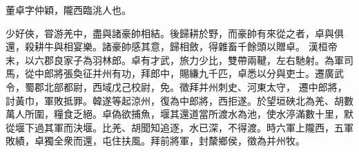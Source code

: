 \begin{pinyinscope}
 
 
 董卓字仲穎，隴西臨洮人也。
 
 
 少好俠，甞游羌中，盡與諸豪帥相結。後歸耕於野，而豪帥有來從之者，卓與俱還，殺耕牛與相宴樂。諸豪帥感其意，歸相斂，得雜畜千餘頭以贈卓。
 漢桓帝末，以六郡良家子為羽林郎。卓有才武，旅力少比，雙帶兩鞬，左右馳射。為軍司馬，從中郎將張奐征并州有功，拜郎中，賜縑九千匹，卓悉以分與吏士。遷廣武令，蜀郡北部都尉，西域戊己校尉，免。徵拜并州刺史、河東太守，
 遷中郎將，討黃巾，軍敗抵罪。韓遂等起涼州，復為中郎將，西拒遂。於望垣硤北為羌、胡數萬人所圍，糧食乏絕。卓偽欲捕魚，堰其還道當所渡水為池，使水渟滿數十里，默從堰下過其軍而決堰。比羌、胡聞知追逐，水已深，不得渡。時六軍上隴西，五軍敗績，卓獨全衆而還，屯住扶風。拜前將軍，封斄鄉侯，徵為并州牧。
 

\end{pinyinscope}
